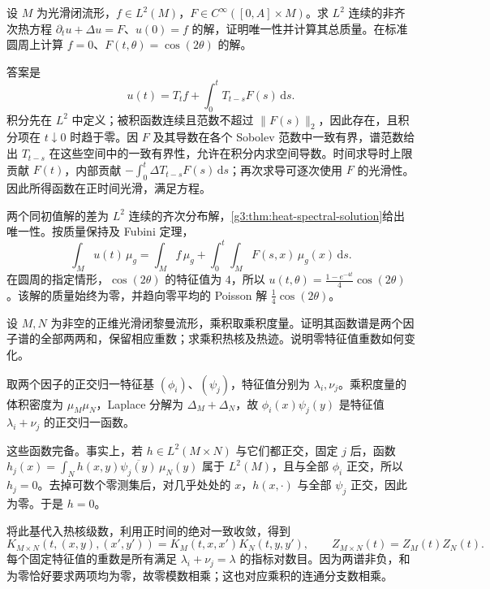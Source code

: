 \begin{exercise}\label{g3:ex:forced-heat-semigroup}
	设 \(M\) 为光滑闭流形，\(f\in L^2(M)\)，\(F\in C^\infty([0,A]\times M)\)。求 \(L^2\) 连续的非齐次热方程 \(\partial_tu+\Delta u=F\)、\(u(0)=f\) 的解，证明唯一性并计算其总质量。在标准圆周上计算 \(f=0\)、\(F(t,\theta)=\cos(2\theta)\) 的解。
\end{exercise}
\begin{solution}
	答案是
	\[
		u(t)=T_tf+\int_0^tT_{t-s}F(s)\,\mathrm ds.
	\]
	积分先在 \(L^2\) 中定义；被积函数连续且范数不超过 \(\|F(s)\|_2\)，因此存在，且积分项在 \(t\downarrow0\) 时趋于零。因 \(F\) 及其导数在各个 Sobolev 范数中一致有界，谱范数给出 \(T_{t-s}\) 在这些空间中的一致有界性，允许在积分内求空间导数。时间求导时上限贡献 \(F(t)\)，内部贡献 \(-\int_0^t\Delta T_{t-s}F(s)\,\mathrm ds\)；再次求导可逐次使用 \(F\) 的光滑性。因此所得函数在正时间光滑，满足方程。

	两个同初值解的差为 \(L^2\) 连续的齐次分布解，\cref{g3:thm:heat-spectral-solution}给出唯一性。按质量保持及 Fubini 定理，
	\[
		\int_Mu(t)\,\mu_g=\int_Mf\,\mu_g+
		\int_0^t\int_MF(s,x)\,\mu_g(x)\,\mathrm ds.
	\]
	在圆周的指定情形，\(\cos(2\theta)\) 的特征值为 \(4\)，所以
	\(u(t,\theta)=\frac{1-e^{-4t}}4\cos(2\theta)\)。该解的质量始终为零，并趋向零平均的 Poisson 解 \(\frac14\cos(2\theta)\)。
\end{solution}

\begin{exercise}\label{g3:ex:product-heat-kernel}
	设 \(M,N\) 为非空的正维光滑闭黎曼流形，乘积取乘积度量。证明其函数谱是两个因子谱的全部两两和，保留相应重数；求乘积热核及热迹。说明零特征值重数如何变化。
\end{exercise}
\begin{solution}
	取两个因子的正交归一特征基 \((\phi_i)\)、\((\psi_j)\)，特征值分别为 \(\lambda_i,\nu_j\)。乘积度量的体积密度为 \(\mu_M\mu_N\)，Laplace 分解为 \(\Delta_M+\Delta_N\)，故 \(\phi_i(x)\psi_j(y)\) 是特征值 \(\lambda_i+\nu_j\) 的正交归一函数。

	这些函数完备。事实上，若 \(h\in L^2(M\times N)\) 与它们都正交，固定 \(j\) 后，函数 \(h_j(x)=\int_Nh(x,y)\overline{\psi_j(y)}\,\mu_N(y)\) 属于 \(L^2(M)\)，且与全部 \(\phi_i\) 正交，所以 \(h_j=0\)。去掉可数个零测集后，对几乎处处的 \(x\)，\(h(x,\cdot)\) 与全部 \(\psi_j\) 正交，因此为零。于是 \(h=0\)。

	将此基代入热核级数，利用正时间的绝对一致收敛，得到
	\[
		K_{M\times N}(t,(x,y),(x',y'))
		=K_M(t,x,x')K_N(t,y,y'),\qquad
		Z_{M\times N}(t)=Z_M(t)Z_N(t).
	\]
	每个固定特征值的重数是所有满足 \(\lambda_i+\nu_j=\lambda\) 的指标对数目。因为两谱非负，和为零恰好要求两项均为零，故零模数相乘；这也对应乘积的连通分支数相乘。
\end{solution}


